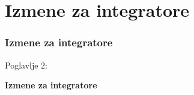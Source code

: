 %

\section{Izmene za integratore}
\begin{frame}[fragile]
	\frametitle{Izmene za integratore}

	\begin{center}\huge{Poglavlje 2:}\end{center}
	\begin{center}\huge{\color{typo3darkgrey}\textbf{Izmene za integratore}}\end{center}

\end{frame}


